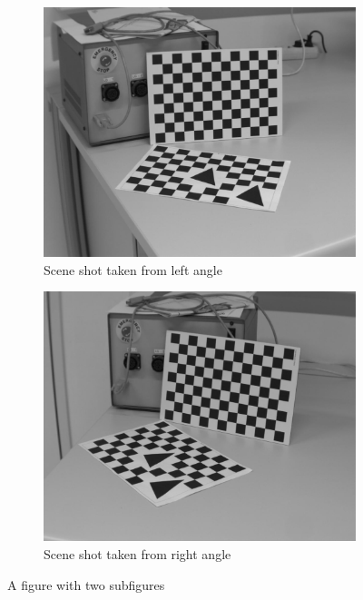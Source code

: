 \documentclass[
a4paper,     %
11pt         %
]{scrartcl}  %
\begin{document}
\begin{figure}[ht!]
\centering
\begin{subfigure}{.5\textwidth}
  \centering
  \includegraphics[scale=0.15]{Bildg_Messtechnik_Lab/FundamentalMatrix/img_left.jpg}
  \caption{Scene shot taken from left angle}
  \label{fig:sub1}
\end{subfigure}%
\begin{subfigure}{.5\textwidth}
  \centering
  \includegraphics[scale=0.15]{Bildg_Messtechnik_Lab/FundamentalMatrix/img_right.jpg}
  \caption{Scene shot taken from right angle}
  \label{fig:sub2}
\end{subfigure}
\caption{A figure with two subfigures}
\label{fig:acquired_images}
\end{figure}
\end{document}
